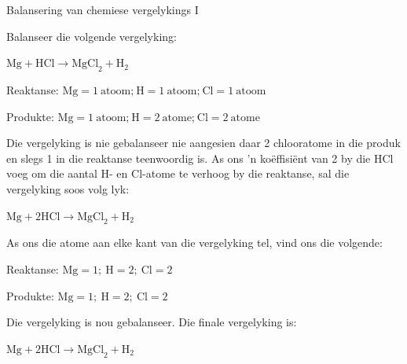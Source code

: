 \begin{wex}{Balansering van chemiese vergelykings I}{Balanseer die volgende vergelyking:
\begin{center}
${\text{Mg} + \text{HCl} \rightarrow \text{MgCl}_{2} + \text{H}_{2}}$\\
\end{center}
}{

Reaktanse: $\text{Mg} = 1 ~\text{atoom;}~ \text{H} = 1 ~\text{atoom;}~ \text{Cl} = 1 ~\text{atoom}$

Produkte: $\text{Mg} = 1 ~\text{atoom;}~ \text{H} = 2 ~\text{atome;}~ \text{Cl} = 2 ~\text{atome}$}

{
Die vergelyking is nie gebalanseer nie aangesien daar 2 chlooratome in die produk en slegs 1 in die reaktanse teenwoordig is. As ons 'n koëffisiënt van 2 by die HCl voeg om die aantal H- en Cl-atome te verhoog by die reaktanse, sal die vergelyking soos volg lyk:
\begin{center}
${\text{Mg} + 2\text{HCl} \rightarrow \text{MgCl}_{2} + \text{H}_{2}}$\\
\end{center}
}

{
As ons die atome aan elke kant van die vergelyking tel, vind ons die volgende:

Reaktanse: $\text{Mg} = 1;~ \text{H} = 2;~ \text{Cl} = 2$

Produkte: $\text{Mg} = 1;~ \text{H} = 2;~ \text{Cl} = 2$

Die vergelyking is nou gebalanseer. Die finale vergelyking is:
\begin{center}
${\text{Mg} + 2\text{HCl} \rightarrow \text{MgCl}_{2} + \text{H}_{2}}$
\end{center}
}
\end{wex}
    \noindent
\par
            \label{m38726*secfhsst!!!underscore!!!id394}
      \noindent

